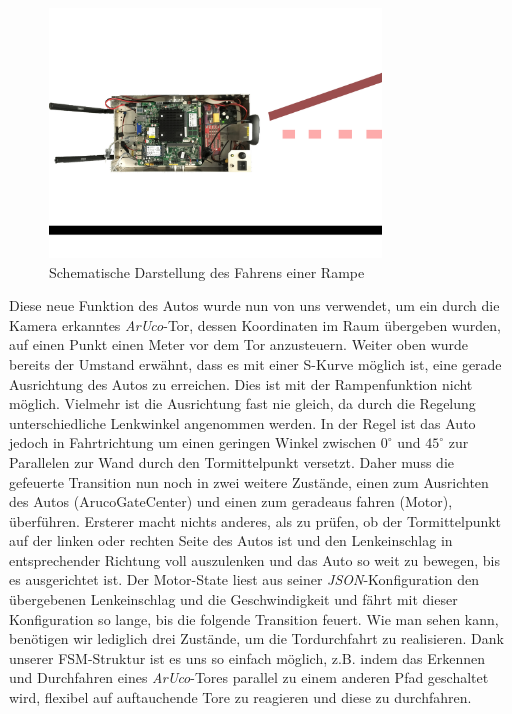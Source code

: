 \begin{figure}[htbp] 
	\centering
	\includegraphics[width=250pt]{images/scharfeRampe.png}
	\caption{Schematische Darstellung des Fahrens einer Rampe}
	\label{fig:ScharfeRampe}
\end{figure}
Diese neue Funktion des Autos wurde nun von uns verwendet, um ein durch die Kamera erkanntes \textit{ArUco}-Tor, dessen Koordinaten im Raum übergeben wurden, auf einen Punkt einen Meter vor dem Tor anzusteuern.
Weiter oben wurde bereits der Umstand erwähnt, dass es mit einer S-Kurve möglich ist, eine gerade Ausrichtung des Autos zu erreichen. Dies ist mit der Rampenfunktion nicht möglich. Vielmehr ist die Ausrichtung fast nie gleich, da durch die Regelung unterschiedliche Lenkwinkel angenommen werden. In der Regel ist das Auto jedoch in Fahrtrichtung um einen geringen Winkel zwischen $0^\circ$ und $45^\circ$ zur Parallelen zur Wand durch den Tormittelpunkt versetzt. Daher muss die gefeuerte Transition nun noch in zwei weitere Zustände, einen zum Ausrichten des Autos (ArucoGateCenter) und einen zum geradeaus fahren (Motor), überführen. Ersterer macht nichts anderes, als zu prüfen, ob der Tormittelpunkt auf der linken oder rechten Seite des Autos ist und den Lenkeinschlag in entsprechender Richtung voll auszulenken und das Auto so weit zu bewegen, bis es ausgerichtet ist. Der Motor-State liest aus seiner \textit{JSON}-Konfiguration den übergebenen Lenkeinschlag und die Geschwindigkeit und fährt mit dieser Konfiguration so lange, bis die folgende Transition feuert. 
\newline
\newline
Wie man sehen kann, benötigen wir lediglich drei Zustände, um die Tordurchfahrt zu realisieren. Dank unserer FSM-Struktur ist es uns so einfach möglich, z.B. indem das Erkennen und Durchfahren eines \textit{ArUco}-Tores parallel zu einem anderen Pfad geschaltet wird, flexibel auf auftauchende Tore zu reagieren und diese zu durchfahren. 
  